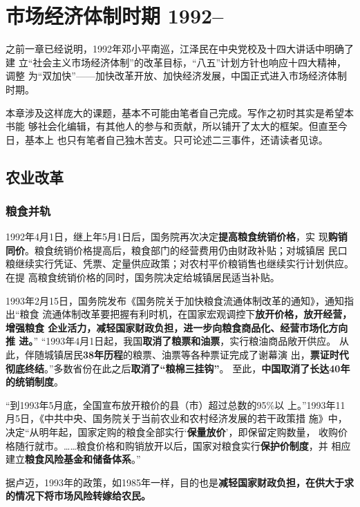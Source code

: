 \chapter{市场经济体制时期 1992--}

之前一章已经说明，1992年邓小平南巡，江泽民在中央党校及十四大讲话中明确了建
立“社会主义市场经济体制”的改革目标，“八五”计划方针也响应十四大精神，调整
为“双加快”——加快改革开放、加快经济发展，中国正式进入市场经济体制时期。

本章涉及这样庞大的课题，基本不可能由笔者自己完成。写作之初时其实是希望本书能
够社会化编辑，有其他人的参与和贡献，所以铺开了太大的框架。但直至今日，基本上
也只有笔者自己独木苦支。只可论述二三事件，还请读者见谅。

\section{农业改革}


\subsection{粮食并轨}

1992年4月1日，继上年5月1日后，国务院再次决定\textbf{提高粮食统销价格}，实
现\textbf{购销同价}。粮食统销价格提高后，粮食部门的经营费用仍由财政补贴；对城镇居
民口粮继续实行凭证、凭票、定量供应政策；对农村平价粮销售也继续实行计划供应。在提
高粮食统销价格的同时，国务院决定给城镇居民适当补贴。

1993年2月15日，国务院发布《国务院关于加快粮食流通体制改革的通知》，通知指出“粮食
流通体制改革要把握有利时机，在国家宏观调控下\textbf{放开价格，放开经营，增强粮食
  企业活力，减轻国家财政负担，进一步向粮食商品化、经营市场化方向推
  进。}” “1993年4月1日起，我国\textbf{取消了粮票和油票}，实行粮油商品敞开供应。
从此，伴随城镇居民\textbf{38年历程}的粮票、油票等各种票证完成了谢幕演
出，\textbf{票证时代彻底终结}。”多数省份在此之后\textbf{取消了“粮棉三挂钩”}。
至此，\textbf{中国取消了长达40年的统销制度}。

“到1993年5月底，全国宣布放开粮价的县（市）超过总数的95\%以
上。”1993年11月5日，《中共中央、国务院关于当前农业和农村经济发展的若干政策措
施》中，决定“从明年起，国家定购的粮食全部实行‘\textbf{保量放价}’，即保留定购数量，
收购价格随行就市。……粮食价格和购销放开以后，国家对粮食实行\textbf{保护价制度}，并
相应建立\textbf{粮食风险基金和储备体系}。”

据卢迈，1993年的政策，如1985年一样，目的也是\textbf{减轻国家财政负担，在供大于求
  的情况下将市场风险转嫁给农民。}\cite{lumaisg}

